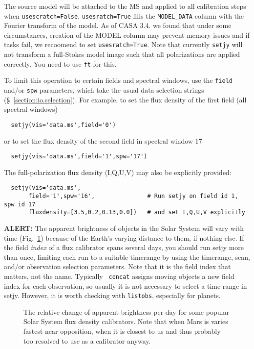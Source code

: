 The source model will be attached to the MS and applied to all
calibration steps when {\tt usescratch=False}. {\tt usesratch=True}
  fills the {\tt MODEL\_DATA} column with the Fourier transform of the
  model. As of CASA 3.4. we found that under some circumstances,
  creation of the MODEL column may prevent memory issues and if tasks
  fail, we recoomend to set {\tt usesratch=True}. Note that currently
  {\tt setjy} will not transform a full-Stokes model image such that
  all polarizations are applied correctly.  You need to use {\tt ft}
  for this.


To limit this operation to certain fields and spectral windows, use
the {\tt field} and/or {\tt spw} parameters, which take the usual
data selection strings (\S~\ref{section:io.selection}). For example, 
to set the flux density of the first field (all spectral windows)
\small
\begin{verbatim}
  setjy(vis='data.ms',field='0')
\end{verbatim}
\normalsize
or to set the flux density of the second field in spectral window 17
\small
\begin{verbatim}
  setjy(vis='data.ms',field='1',spw='17')
\end{verbatim}
\normalsize
The full-polarization flux density (I,Q,U,V) may also be explicitly provided:
\small
\begin{verbatim}
  setjy(vis='data.ms',
       field='1',spw='16',               # Run setjy on field id 1, spw id 17
       fluxdensity=[3.5,0.2,0.13,0.0])   # and set I,Q,U,V explicitly
\end{verbatim}
\normalsize


{\bf ALERT:} The apparent brightness of objects in the Solar System
will vary with time (Fig.~\ref{fig:reldelfdperday}) because of the
Earth's varying distance to them, if nothing else.  If the field {\it
  index} of a flux calibrator spans several days, you should run setjy
more than once, limiting each run to a suitable timerange by using the
timerange, scan, and/or observation selection parameters.  Note that
it is the field index that matters, not the name.  Typically {\tt
  concat} assigns moving objects a new field index for each
observation, so usually it is not necessary to select a time range in
setjy.  However, it is worth checking with {\tt listobs}, especially
for planets.

\begin{figure}
\label{fig:reldelfdperday}
\caption{The relative change of apparent brightness per day for some
popular Solar System flux density calibrators.  Note that when Mars is
varies fastest near opposition, when it is closest to us and thus probably
too resolved to use as a calibrator anyway.}  
\end{figure}


